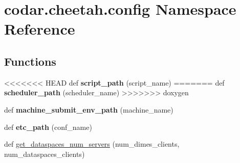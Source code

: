 \hypertarget{namespacecodar_1_1cheetah_1_1config}{}\section{codar.\+cheetah.\+config Namespace Reference}
\label{namespacecodar_1_1cheetah_1_1config}
\subsection*{Functions}
\begin{DoxyCompactItemize}
\item 
<<<<<<< HEAD
\mbox{\label{namespacecodar_1_1cheetah_1_1config_aaecac5db531a7ad2e0a6cb121a7ee640}} 
def {\bfseries script\+\_\+path} (script\+\_\+name)
=======
\mbox{\label{namespacecodar_1_1cheetah_1_1config_ae1608746b2c45e5199964e986dbc66da}} 
def {\bfseries scheduler\+\_\+path} (scheduler\+\_\+name)
>>>>>>> doxygen
\item 
\mbox{\label{namespacecodar_1_1cheetah_1_1config_a906f4dbe8936921e615b9cc8eae8383f}} 
def {\bfseries machine\+\_\+submit\+\_\+env\+\_\+path} (machine\+\_\+name)
\item 
\mbox{\label{namespacecodar_1_1cheetah_1_1config_a1028977b1cc5dc7f54bd65cb46256c8d}} 
def {\bfseries etc\+\_\+path} (conf\+\_\+name)
\item 
def \hyperlink{namespacecodar_1_1cheetah_1_1config_a777b4339975017c9521b943afd76748d}{get\+\_\+dataspaces\+\_\+num\+\_\+servers} (num\+\_\+dimes\+\_\+clients, num\+\_\+dataspaces\+\_\+clients)
\end{DoxyCompactItemize}
